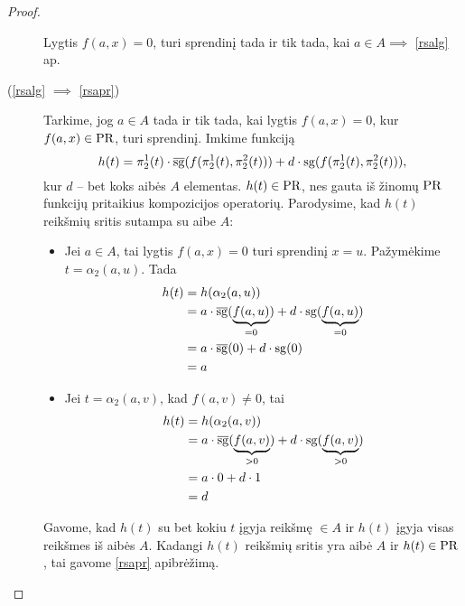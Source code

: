 \begin{prop}
\begin{proof}
\begin{description}
        Lygtis $f(a,x)=0$, turi sprendinį tada ir tik tada, 
        kai $a \in A \implies$ \ref{rsalg} ap.
      \item[(\ref{rsalg} $\implies$ \ref{rsapr})]
        Tarkime, jog $a \in A$ tada ir tik tada, kai lygtis 
        $f(a,x) = 0$, kur $f(a,x) \in \mathop{\text{PR}}$, turi sprendinį.
        Imkime funkciją
        \[
        h(t)=\pi^{1}_{2}(t) \cdot \sgi(f(\pi^{1}_{2}(t),\pi^{2}_{2}(t)))%
        + d \cdot \sg(f(\pi^{1}_{2}(t), \pi_{2}^{2}(t))), 
        \]
        kur $d$ – bet koks aibės $A$ elementas. $h(t) \in \mathop{\text{PR}}$, nes gauta
        iš žinomų $\mathop{\text{PR}}$ funkcijų pritaikius kompozicijos operatorių.
        Parodysime, kad $h(t)$ reikšmių sritis sutampa su aibe $A$:
        \begin{itemize}
          \item Jei $a \in A$, tai lygtis $f(a,x) = 0$ turi sprendinį
            $x = u$. Pažymėkime $t = \alpha_{2}(a, u)$. Tada
            \begin{align*}
              h(t) &= h(\alpha_{2}(a, u)) \\
              &= a \cdot \sgi(\underbrace{f(a, u)}_{= 0}) + %
                d \cdot \sg(\underbrace{f(a, u)}_{= 0}) \\
              &= a \cdot \sgi(0) + d \cdot \sg(0) \\
              &= a
            \end{align*}
          \item Jei $t = \alpha_{2}(a, v)$, kad $f(a, v) \neq 0$, tai
            \begin{align*}
              h(t) &= h(\alpha_{2}(a, v)) \\
              &= a \cdot \sgi(\underbrace{f(a, v)}_{> 0}) + %
                d \cdot \sg(\underbrace{f(a, v)}_{> 0}) \\
              &= a \cdot 0 + d \cdot 1 \\
              &= d
            \end{align*}
        \end{itemize}
        Gavome, kad $h(t)$ su bet kokiu $t$ įgyja reikšmę $\in A$ ir 
        $h(t)$ įgyja visas reikšmes iš aibės $A$. Kadangi 
        $h(t)$ reikšmių sritis yra aibė $A$ ir $h(t) \in \mathop{\text{PR}}$, tai
        gavome \ref{rsapr} apibrėžimą.
    \end{description}
  \end{proof}
\end{prop}

